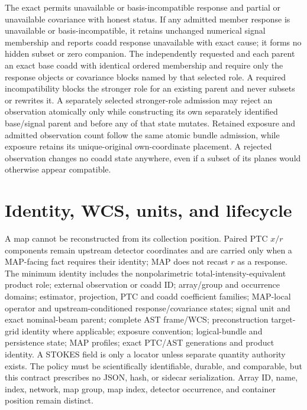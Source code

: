 \documentclass[10pt]{article}
\begin{document}
\SCIMapCoaddResponseFamilyDefinition

The exact \SCIMapBaseCoaddRole{} permits unavailable or basis-incompatible
response and partial or unavailable covariance with honest status. If any
admitted member response is unavailable or basis-incompatible, it retains
unchanged numerical signal membership and reports coadd response unavailable
with exact cause; it forms no hidden subset or zero companion. The
independently requested \SCIMapResponseCoaddRole{} and
\SCIMapCovarianceCoaddRole{} each parent an exact base coadd with identical
ordered membership and require only the response objects or covariance blocks
named by that selected role. A required incompatibility blocks the stronger
role for an existing parent and never subsets or rewrites it. A separately
selected stronger-role admission may reject an observation atomically only
while constructing its own separately identified base/signal parent and before
any of that state mutates. Retained exposure and admitted
observation count follow the same atomic bundle admission, while exposure
retains its unique-original own-coordinate placement.
A rejected observation changes no
coadd state anywhere, even if a subset of its planes would otherwise appear
compatible.

\clearpage
\section{Identity, WCS, units, and lifecycle}

A map cannot be reconstructed from its collection position. Paired PTC
\(x/r\) components remain upstream detector coordinates and are carried only
when a MAP-facing fact requires their identity; MAP does not recast \(r\) as a
response. The minimum
identity includes the nonpolarimetric total-intensity-equivalent product role;
external observation or coadd ID; array/group and occurrence domains;
estimator, projection, PTC and coadd coefficient families; MAP-local operator
and upstream-conditioned response/covariance states; signal unit and exact
nominal-beam parent; complete AST frame/WCS; preconstruction target-grid
identity where applicable; exposure convention; logical-bundle and persistence
state; MAP profiles; exact PTC/AST generations and product identity. A STOKES
field is only a locator unless separate quantity authority exists. The policy must
be scientifically identifiable, durable, and comparable, but this contract
prescribes no JSON, hash, or sidecar serialization. Array ID, name, index,
network, map group, map index,
detector occurrence, and container position remain distinct.
\end{document}
